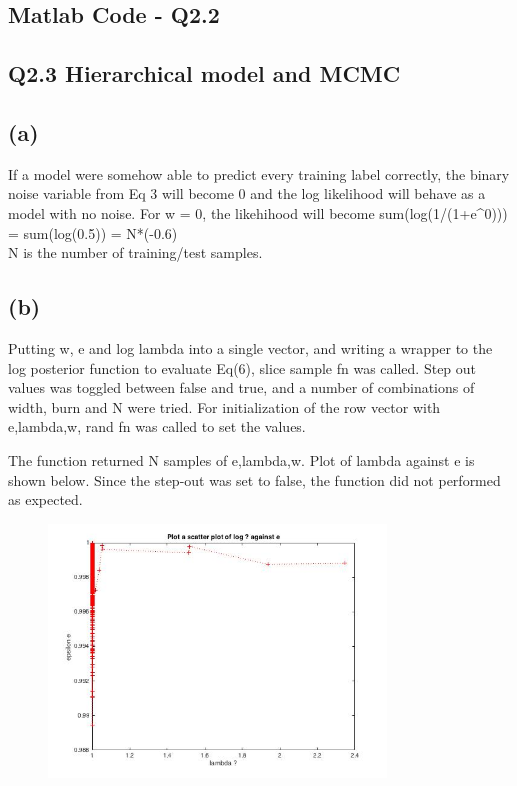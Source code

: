 \documentclass[english]{article}
\begin{document}
\subsection*{Matlab Code - Q2.2}



\subsection*{ Q2.3 Hierarchical model and MCMC}


\subsection*{(a)}

If a model were somehow able to predict every training label correctly, the binary 
noise variable from Eq 3 will become 0 and the log likelihood will behave as a 
model with no noise.
For w = 0, the likehihood will become sum(log(1/(1+e^0))) = sum(log(0.5)) = N*(-0.6)
\\
 N is the number of training/test samples.

\subsection*{(b)}

Putting w, e and log lambda into a single vector, and writing a wrapper to the log posterior
function to evaluate  Eq(6), slice sample fn was called. Step out values was toggled
between false and true, and a number of combinations of width, burn and N were tried.
For initialization of the row vector with {e,lambda,w}, rand fn was called to set the values.

The function returned N samples of {e,lambda,w}. Plot of lambda against e is shown below.
Since the step-out was set to false, the function did not performed as expected.
  
\begin{figure}[h!]
  \caption{}
  \centering
    \includegraphics[width=0.8\textwidth]{last_fig.jpg}
\end{figure}
\end{document}
